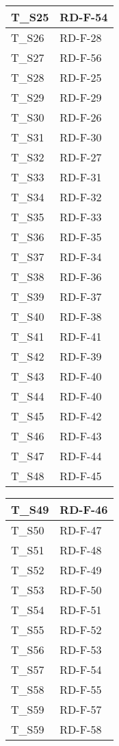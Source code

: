 \begin{center}
\begin{tabular}{|m{6em}|m{8em}|}
        \hline
        T\_S25 & RD-F-54\\
        \hline
        T\_S26 & RD-F-28\\
        \hline
        T\_S27 & RD-F-56\\
        \hline
        T\_S28 & RD-F-25\\
        \hline
        T\_S29 & RD-F-29\\
        \hline
        T\_S30 & RD-F-26\\
        \hline
        T\_S31 & RD-F-30\\
        \hline
        T\_S32 & RD-F-27\\
        \hline
        T\_S33 & RD-F-31\\
        \hline
        T\_S34 & RD-F-32\\
        \hline
        T\_S35 & RD-F-33\\
        \hline
        T\_S36 & RD-F-35\\
        \hline
        T\_S37 & RD-F-34\\
        \hline
        T\_S38 & RD-F-36\\
        \hline

        T\_S39 & RD-F-37\\
        \hline
        T\_S40 & RD-F-38\\
        \hline
        T\_S41 & RD-F-41\\
        \hline
        T\_S42 & RD-F-39\\
        \hline
        T\_S43 & RD-F-40\\
        \hline
        T\_S44 & RD-F-40\\
        \hline
        T\_S45 & RD-F-42\\
        \hline
        T\_S46 & RD-F-43\\
        \hline
        T\_S47 & RD-F-44\\
        \hline
        T\_S48 & RD-F-45\\
        \hline
      \end{tabular}
      \newpage
      \renewcommand{\arraystretch}{1.8}
      \begin{tabular}{|m{6em}|m{8em}|}
          \hline
        T\_S49 & RD-F-46\\
        \hline
        T\_S50 & RD-F-47\\
        \hline
        T\_S51 & RD-F-48\\
        \hline
        T\_S52 & RD-F-49\\
        \hline
        T\_S53 & RD-F-50\\
        \hline
        T\_S54 & RD-F-51\\
        \hline
        T\_S55 & RD-F-52\\
        \hline
        T\_S56 & RD-F-53\\
        \hline
        T\_S57 & RD-F-54\\
        \hline
        T\_S58 & RD-F-55\\
        \hline
        T\_S59 & RD-F-57\\
        \hline
        T\_S59 & RD-F-58\\
        \hline
    \end{tabular}
\end{center}